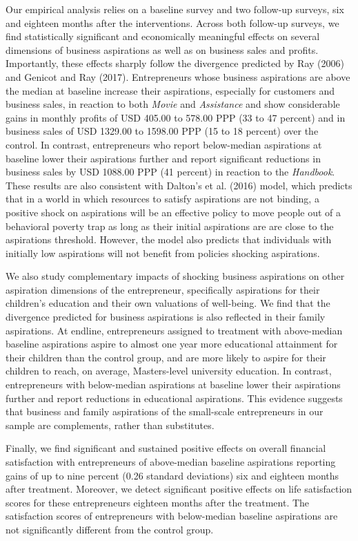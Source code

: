 \documentclass[11.5pt]{article}
\begin{document}
Our empirical analysis relies on a baseline survey and two follow-up surveys, six and eighteen months after the interventions. Across both follow-up surveys, we find statistically significant and economically meaningful effects on several dimensions of business aspirations as well as on business sales and profits. Importantly, these effects sharply follow the divergence predicted by Ray (2006) and Genicot and Ray (2017). Entrepreneurs whose business aspirations are above the median at baseline increase their aspirations, especially for customers and business sales, in reaction to both \emph{Movie} and \emph{Assistance} and show considerable gains in monthly profits of USD 405.00 to 578.00 PPP (33 to 47 percent) and in business sales of USD 1329.00 to 1598.00 PPP (15 to 18 percent) over the control. In contrast, entrepreneurs who report below-median aspirations at baseline lower their aspirations further and report significant reductions in business sales by USD 1088.00 PPP (41 percent) in reaction to the \emph{Handbook}. These results are also consistent with Dalton's et al. (2016) model, which predicts that in a world in which resources to satisfy aspirations are not binding, a positive shock on aspirations will be an effective policy to move people out of a behavioral poverty trap as long as their initial aspirations are are close to the aspirations threshold. However, the model also predicts that individuals with initially low aspirations will not benefit from policies shocking aspirations.

We also study complementary impacts of shocking business aspirations on other aspiration dimensions of the entrepreneur, specifically aspirations for their children's education and their own valuations of well-being. We find that the divergence predicted for business aspirations is also reflected in their family aspirations. At endline, entrepreneurs assigned to treatment with above-median baseline aspirations aspire to almost one year more educational attainment for their children than the control group, and are more likely to aspire for their children to reach, on average, Masters-level university education. In contrast, entrepreneurs with below-median aspirations at baseline lower their aspirations further and report reductions in educational aspirations. This evidence suggests that business and family aspirations of the small-scale entrepreneurs in our sample are complements, rather than substitutes.

Finally, we find significant and sustained positive effects on overall financial satisfaction with entrepreneurs of above-median baseline aspirations reporting gains of up to nine percent (0.26 standard deviations) six and eighteen months after treatment. Moreover, we detect significant positive effects on life satisfaction scores for these entrepreneurs eighteen months after the treatment. The satisfaction scores of entrepreneurs with below-median baseline aspirations are not significantly different from the control group.
\end{document}
